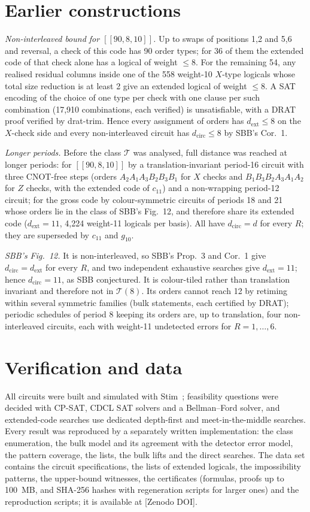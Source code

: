 \documentclass[aps,prl,twocolumn,superscriptaddress,nofootinbib]{revtex4-2}
\newcommand{\dcirc}{d_{\mathrm{circ}}}
\newcommand{\dext}{d_{\mathrm{ext}}}
\newcommand{\code}[1]{[[#1]]}
\newcommand{\T}{\mathcal{T}}
\begin{document}
\section{Earlier constructions}\label{sm:earlier}
\emph{Non-interleaved bound for $\code{90,8,10}$.} Up to swaps of positions 1,2 and 5,6
and reversal, a check of this code has 90 order types; for 36 of them the extended code of
that check alone has a logical of weight $\le8$. For the remaining 54, any realised residual
columns inside one of the 558 weight-10 $X$-type logicals whose total size reduction is at
least 2 give an extended logical of weight $\le8$. A SAT encoding of the choice of one type
per check with one clause per such combination (17,910 combinations, each verified) is
unsatisfiable, with a DRAT proof verified by drat-trim. Hence every assignment of orders has
$\dext\le8$ on the $X$-check side and every non-interleaved circuit has $\dcirc\le8$ by SBB's
Cor.~1.

\emph{Longer periods.} Before the class $\T$ was analysed, full distance was reached at
longer periods: for $\code{90,8,10}$ by a translation-invariant period-16 circuit with three
CNOT-free steps (orders $A_2A_1A_3B_2B_3B_1$ for $X$ checks and $B_1B_3B_2A_3A_1A_2$ for $Z$
checks, with the extended code of $c_{11}$) and a non-wrapping period-12 circuit; for the gross
code by colour-symmetric circuits of periods 18 and 21 whose orders lie in the class of SBB's
Fig.~12, and therefore share its extended code ($\dext=11$, 4,224 weight-11 logicals per
basis). All have $\dcirc=d$ for every $R$; they are superseded by $c_{11}$ and $g_{10}$.

\emph{SBB's Fig.~12.} It is non-interleaved, so SBB's Prop.~3 and Cor.~1 give
$\dcirc=\dext$ for every $R$, and two independent exhaustive searches give $\dext=11$; hence
$\dcirc=11$, as SBB conjectured. It is colour-tiled rather than translation invariant and
therefore not in $\T(8)$. Its orders cannot reach 12 by retiming within several symmetric
families (bulk statements, each certified by DRAT); periodic schedules of period 8 keeping
its orders are, up to translation, four non-interleaved circuits, each with weight-11
undetected errors for $R=1,\dots,6$.

\section{Verification and data}\label{sm:data}
All circuits were built and simulated with Stim~\cite{Gidney2021stim}; feasibility
questions were decided with CP-SAT, CDCL SAT solvers and a Bellman--Ford solver, and
extended-code searches use dedicated depth-first and meet-in-the-middle searches. Every
result was reproduced by a separately written implementation: the class enumeration, the
bulk model and its agreement with the detector error model, the pattern coverage, the
lists, the bulk lifts and the direct searches. The data set contains the circuit
specifications, the lists of extended logicals, the impossibility patterns, the upper-bound
witnesses, the certificates (formulas, proofs up to 100~MB, and SHA-256 hashes with
regeneration scripts for larger ones) and the reproduction scripts; it is available at
[Zenodo DOI].
\end{document}
